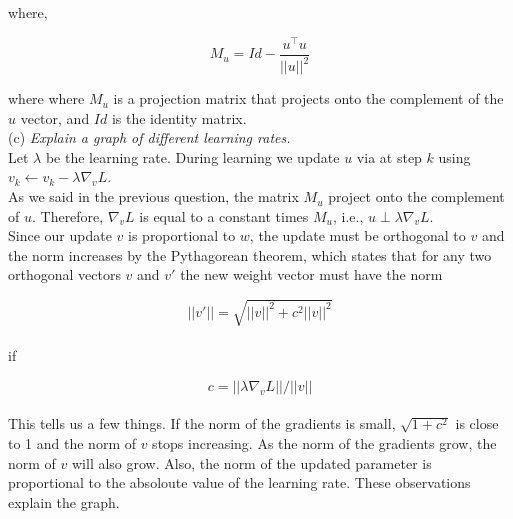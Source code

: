 \documentclass{amsart}
\theoremstyle{definition}
\theoremstyle{remark}
\numberwithin{equation}{section}
\begin{document}
where,

\begin{equation}
M_{u} = Id - \frac{u^\top u}{||u||^{2}}
\end{equation}

where where $M_{u}$ is a projection matrix that projects onto the complement
of the $u$ vector, and $Id$ is the identity matrix. \\

(c) \textit{Explain a graph of different learning rates. }\\

Let $\lambda$ be the learning rate. During learning we update $u$ via at step $k$
using $v_k \leftarrow v_k - \lambda\nabla_vL$. \\

As we said in the previous question, the matrix $M_u$ project onto the
complement of $u$. Therefore, $\nabla_vL$ is equal to a constant times
$M_u$, i.e., $u \perp \lambda\nabla_vL$. \\

Since our update $v$ is proportional to $w$, the update must be orthogonal to
$v$ and the norm increases by the Pythagorean theorem, which states that for any
two orthogonal vectors $v$ and $v'$ the new weight vector must have the norm

\begin{equation}
||v'|| = \sqrt{||v||^2 + c^2 ||v||^2}
\end{equation} \\

if

\begin{equation}
c = || \lambda\nabla_vL || / ||v||
\end{equation} \\

This tells us a few things. If the norm of the gradients is small,
$\sqrt{1 + c^2}$ is close to 1 and the norm of $v$ stops increasing. As the
norm of the gradients grow, the norm of $v$ will also grow. Also, the norm of
the updated parameter is proportional to the absoloute value of the learning
rate. These observations explain the graph.
\end{document}
